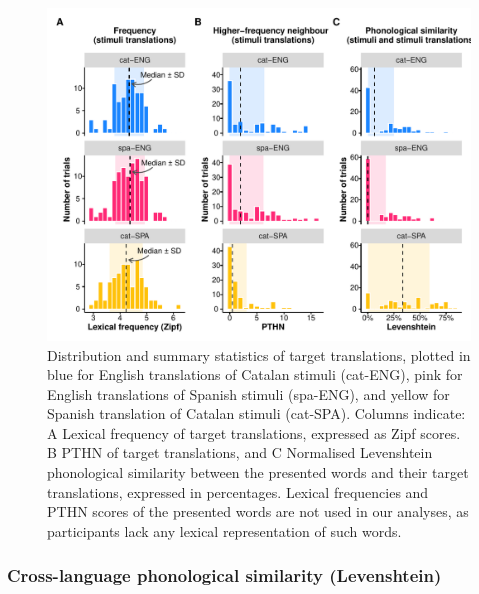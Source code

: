 \documentclass[
  english,
  man,floatsintext]{apa7}
\begin{document}
\begin{figure}
\includegraphics[width=1\linewidth]{manuscript_files/figure-latex/stimuliplot-1} \caption{Distribution and summary statistics of target translations, plotted in blue for English translations of Catalan stimuli (cat-ENG), pink for English translations of Spanish stimuli (spa-ENG), and yellow for Spanish translation of Catalan stimuli (cat-SPA). Columns indicate: A\) Lexical frequency of target translations, expressed as Zipf scores. B\) PTHN of target translations, and C\) Normalised Levenshtein phonological similarity between the presented words and their target translations, expressed in percentages. Lexical frequencies and PTHN scores of the presented words are not used in our analyses, as participants lack any lexical representation of such words.}\label{fig:stimuliplot}
\end{figure}

\hypertarget{cross-language-phonological-similarity-levenshtein}{%
\subsubsection{Cross-language phonological similarity (Levenshtein)}\label{cross-language-phonological-similarity-levenshtein}}
\end{document}
